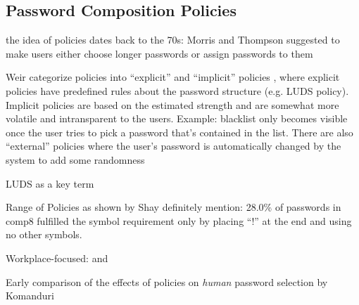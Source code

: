 	\subsection{Password Composition Policies}
	
	the idea of policies dates back to the 70s: Morris and Thompson suggested to make users
	either choose longer passwords or assign passwords to them \cite{Morris1979PasswordSecurity}
	
	
	
	Weir \etal categorize policies into ``explicit'' and ``implicit'' policies \cite{Weir2010MetricsPolicies}, where explicit policies have predefined rules about the password structure (e.g. LUDS policy). Implicit policies are based on the estimated strength and are somewhat more volatile and intransparent to the users. Example: blacklist only becomes visible once the user tries to pick a password that's contained in the list. There are also ``external'' policies where the user's password is automatically changed by the system to add some randomness
	
	
	LUDS as a key term \cite{Wheeler2016zxcvbn}
	
		
	Range of Policies as shown by Shay \cite{Shay2014CanLongPasswordsBeSecureAndUsable}
	definitely mention: 28.0\% of passwords in comp8 fulfilled the symbol requirement only by placing ``!'' at the end and using no other symbols. 
	
	\cite{ZhangKennedy2016RevisitingPasswordRules}
	
	
	Workplace-focused: \cite{Inglesant2010TrueCostOfUnusablePolicies} and \cite{Zakaria2013DesigningEffectiveSecurityMessages}
	
	\cite{Florencio2014AdministratorsGuide} 
	
	\cite{Ur2015PWCreationLab}
	
	\cite{Shay2010EncounteringPasswordRequirements}
	
	\cite{Shay2016DesigningPasswordPolicies}
	
	\cite{Weir2010MetricsPolicies}
	
	\cite{Wang2015EmperorsPolicies}
	
	
	\cite{Florencio2010WhereDoPoliciesComeFrom}
	
	\cite{Horsch2016PasswordPolicyMarkup}
	
	\cite{Chiasson2015QuantifyingExpiration}
	\cite{Blocki2013OptimizingPasswordPolicies}
	
	Early comparison of the effects of policies on \textit{human} password selection by Komanduri \etal
	\cite{Komanduri2011OfPasswordsAndPeople}
	

